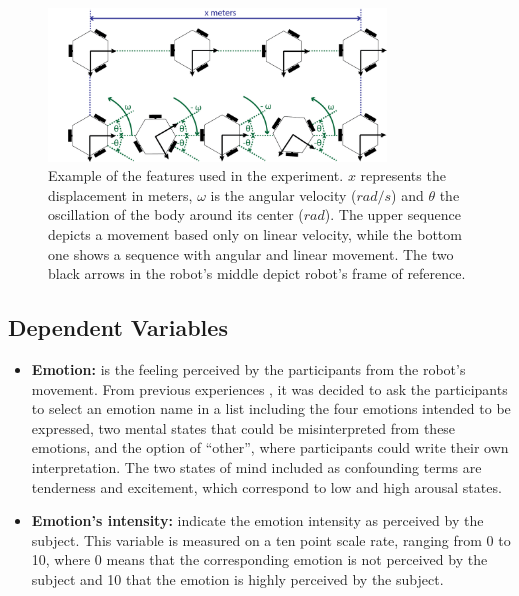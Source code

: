 \begin{figure}
	\centering
	\includegraphics[width=0.80\textwidth]{./Images/ExampleMovement.png} 
	\caption{Example of the features used in the experiment. $x$ represents the displacement in meters, $\omega$ is the angular velocity ($rad/s$) and $\theta$ the oscillation of the body around its center ($rad$). The upper sequence depicts a movement based only on linear velocity, while the bottom one shows a sequence with angular and linear movement. The two black arrows in the robot's middle depict robot's frame of reference.}
	\label{fig:angular_movement}
	
\end{figure} 

\subsection{Dependent Variables}

\begin{itemize}
	\item \textbf{Emotion:} is the feeling perceived by the participants from the robot's movement. From previous experiences %
	, it was decided to ask the participants to select an emotion name in a list including the four emotions intended to be expressed,  two mental states that could be misinterpreted from these emotions, and the option of ``other'', where participants could write their own interpretation. 
	The two  states of mind included as confounding terms are tenderness and excitement, which correspond to low and high arousal states.
	
	\item \textbf{Emotion's intensity:} indicate the emotion intensity as perceived by the subject. This variable is measured on a ten point scale rate, ranging from 0 to 10, where 0 means that the corresponding emotion is not perceived by the subject and 10 that the emotion is highly perceived by the subject. 

\end{itemize}
